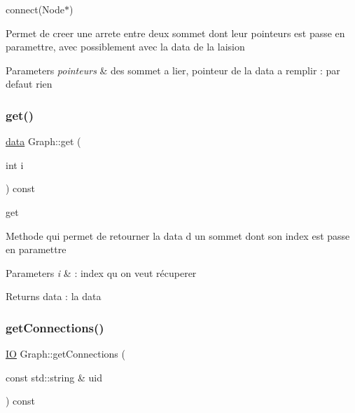connect(\+Node$\ast$) 

Permet de creer une arrete entre deux sommet dont leur pointeurs est passe en paramettre, avec possiblement avec la data de la laision


\begin{DoxyParams}{Parameters}
{\em pointeurs} & des sommet a lier, pointeur de la data a remplir \+: par defaut rien \\
\hline
\end{DoxyParams}
\mbox{\label{class_graph_a78762961b8cf256a828c80cb7ec26021}} 
\subsubsection{\texorpdfstring{get()}{get()}}
{\footnotesize\ttfamily \mbox{\hyperlink{_graph_8h_a98cbe1f79429fc62806b32b6e8871d9e}{data}} Graph\+::get (\begin{DoxyParamCaption}\item[{int}]{i }\end{DoxyParamCaption}) const}



get 

Methode qui permet de retourner la data d un sommet dont son index est passe en paramettre


\begin{DoxyParams}{Parameters}
{\em i} & \+: index qu on veut récuperer \\
\hline
\end{DoxyParams}
\begin{DoxyReturn}{Returns}
data \+: la data 
\end{DoxyReturn}
\mbox{\label{class_graph_a163656854e289f8dbdf037683d581dec}} 
\subsubsection{\texorpdfstring{get\+Connections()}{getConnections()}\hspace{0.1cm}{\footnotesize\ttfamily [1/2]}}
{\footnotesize\ttfamily \mbox{\hyperlink{_graph_8h_a383232190011cffd7d1fb05d72e89928}{IO}} Graph\+::get\+Connections (\begin{DoxyParamCaption}\item[{const std\+::string \&}]{uid }\end{DoxyParamCaption}) const}



